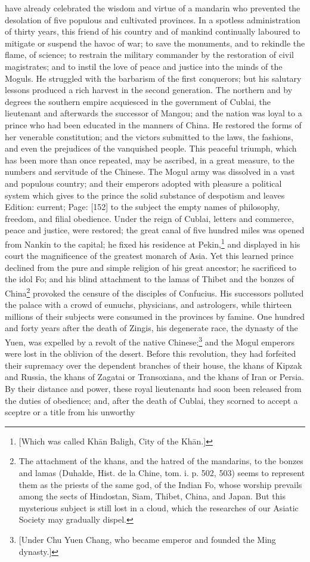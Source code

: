 have already celebrated the wisdom and virtue of a mandarin who prevented the desolation of five populous and cultivated provinces. In a spotless administration of thirty years, this friend of his country and of mankind continually laboured to mitigate or suspend the havoc of war; to save the monuments, and to rekindle the flame, of science; to restrain the military commander by the restoration of civil magistrates; and to instil the love of peace and justice into the minds of the Moguls. He struggled with the barbarism of the first conquerors; but his salutary lessons produced a rich harvest in the second generation. The northern and by degrees the southern empire acquiesced in the government of Cublai, the lieutenant and afterwards the successor of Mangou; and the nation was loyal to a prince who had been educated in the manners of China. He restored the forms of her venerable constitution; and the victors submitted to the laws, the fashions, and even the prejudices of the vanquished people. This peaceful triumph, which has been more than once repeated, may be ascribed, in a great measure, to the numbers and servitude of the Chinese. The Mogul army was dissolved in a vast and populous country; and their emperors adopted with pleasure a political system which gives to the prince the solid substance of despotism and leaves Edition: current; Page: [152] to the subject the empty names of philosophy, freedom, and filial obedience. Under the reign of Cublai, letters and commerce, peace and justice, were restored; the great canal of five hundred miles was opened from Nankin to the capital; he fixed his residence at Pekin,\footnote{[Which was called Khān Baligh, City of the Khān.]} and displayed in his court the magnificence of the greatest monarch of Asia. Yet this learned prince declined from the pure and simple religion of his great ancestor; he sacrificed to the idol Fo; and his blind attachment to the lamas of Thibet and the bonzes of China\footnote{The attachment of the khans, and the hatred of the mandarins, to the bonzes and lamas (Duhalde, Hist. de la Chine, tom. i. p. 502, 503) seems to represent them as the priests of the same god, of the Indian Fo, whose worship prevails among the sects of Hindostan, Siam, Thibet, China, and Japan. But this mysterious subject is still lost in a cloud, which the researches of our Asiatic Society may gradually dispel.} provoked the censure of the disciples of Confucius. His successors polluted the palace with a crowd of eunuchs, physicians, and astrologers, while thirteen millions of their subjects were consumed in the provinces by famine. One hundred and forty years after the death of Zingis, his degenerate race, the dynasty of the Yuen, was expelled by a revolt of the native Chinese;\footnote{[Under Chu Yuen Chang, who became emperor and founded the Ming dynasty.]} and the Mogul emperors were lost in the oblivion of the desert. Before this revolution, they had forfeited their supremacy over the dependent branches of their house, the khans of Kipzak and Russia, the khans of Zagatai or Transoxiana, and the khans of Iran or Persia. By their distance and power, these royal lieutenants had soon been released from the duties of obedience; and, after the death of Cublai, they scorned to accept a sceptre or a title from his unworthy 